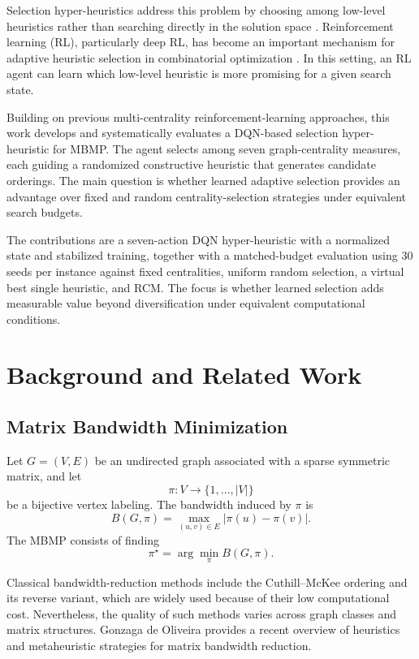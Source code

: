 \documentclass[runningheads]{llncs}
\begin{document}
Selection hyper-heuristics address this problem by choosing among low-level heuristics rather than searching directly in the solution space \cite{burke2013}. Reinforcement learning (RL), particularly deep RL, has become an important mechanism for adaptive heuristic selection in combinatorial optimization \cite{mazyavkina2021,kallestad2023,zhang2022}. In this setting, an RL agent can learn which low-level heuristic is more promising for a given search state.

Building on previous multi-centrality reinforcement-learning approaches, this work develops and systematically evaluates a DQN-based selection hyper-heuristic for MBMP. The agent selects among seven graph-centrality measures, each guiding a randomized constructive heuristic that generates candidate orderings. The main question is whether learned adaptive selection provides an advantage over fixed and random centrality-selection strategies under equivalent search budgets.

The contributions are a seven-action DQN hyper-heuristic with a normalized state and stabilized training, together with a matched-budget evaluation using 30 seeds per instance against fixed centralities, uniform random selection, a virtual best single heuristic, and RCM. The focus is whether learned selection adds measurable value beyond diversification under equivalent computational conditions.

\section{Background and Related Work}

\subsection{Matrix Bandwidth Minimization}

Let $G=(V,E)$ be an undirected graph associated with a sparse symmetric matrix, and let
\[
\pi: V \rightarrow \{1,\ldots,|V|\}
\]
be a bijective vertex labeling. The bandwidth induced by $\pi$ is
\[
B(G,\pi)=\max_{(u,v)\in E} |\pi(u)-\pi(v)|.
\]
The MBMP consists of finding
\[
\pi^\star = \arg\min_{\pi} B(G,\pi).
\]

Classical bandwidth-reduction methods include the Cuthill--McKee ordering \cite{cuthill1969} and its reverse variant, which are widely used because of their low computational cost. Nevertheless, the quality of such methods varies across graph classes and matrix structures. Gonzaga de Oliveira \cite{gonzaga2025} provides a recent overview of heuristics and metaheuristic strategies for matrix bandwidth reduction.
\end{document}
